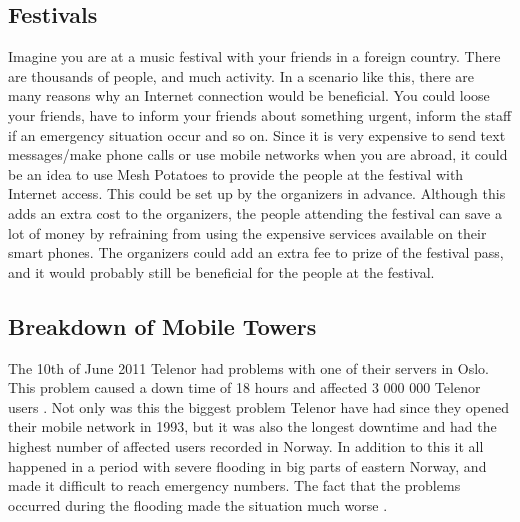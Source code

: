 \subsection{Festivals}
Imagine you are at a music festival with your friends in a foreign country. There are thousands of people, and much activity. In a scenario like this, there are many reasons why an Internet connection would be beneficial. You could loose your friends, have to inform your friends about something urgent, inform the staff if an emergency situation occur and so on. Since it is very expensive to send text messages/make phone calls or use mobile networks when you are abroad, it could be an idea to use Mesh Potatoes to provide the people at the festival with Internet access. This could be set up by the organizers in advance. Although this adds an extra cost to the organizers, the people attending the festival can save a lot of money by refraining from using the expensive services available on their smart phones. The organizers could add an extra fee to prize of the festival pass, and it would probably still be beneficial for the people at the festival. 

\subsection{Breakdown of Mobile Towers}

The 10th of June 2011 Telenor had problems with one of their servers in Oslo. This problem caused a down time of 18 hours and affected 3 000 000 Telenor users \cite{listeNedetid}. Not only was this the biggest problem Telenor have had since they opened their mobile network in 1993, but it was also the longest downtime and had the highest number of affected users recorded in Norway. In addition to this it all happened in a period with severe flooding in big parts of eastern Norway, and made it difficult to reach emergency numbers. The fact that the problems occurred during the flooding made the situation much worse \cite{TelenorNede}.

